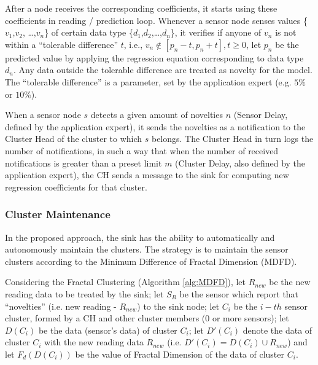 \documentclass{acm_proc_article-sp}
\begin{document}
After a node receives the corresponding coefficients, it starts using these
coefficients in reading / prediction loop.
Whenever a sensor node senses values \{$v_{1}$,$v_{2}$, \ldots,$v_{n}$\} of
certain data type \{$d_{1}$,$d_{2}$,\ldots,$d_{n}$\}, it verifies if anyone of
$v_{n}$ is not within a ``tolerable difference'' $t$, i.e., $v_{n} \not \in
[p_{n}-t,p_{n}+t], t \geq 0$, let $p_{n}$ be the predicted value by applying
the regression equation corresponding to data type $d_{n}$. Any data outside the
tolerable difference are treated as novelty for the model.
The ``tolerable difference'' is a parameter, set by the application expert (e.g.
$5\%$ or $10\%$).



When a sensor node $s$ detects a given amount of novelties $n$ (Sensor Delay,
defined by the application expert), it sends the novelties as a notification to
the Cluster Head of the cluster to which $s$ belongs. The Cluster Head in turn
logs the number of notifications, in such a way that when the number of received
notifications is greater than a preset limit $m$ (Cluster Delay, also
defined by the application expert), the CH sends a message to the sink for
computing new regression coefficients for that cluster.


\subsubsection{Cluster Maintenance}
\label{cluster-maintenance}

In the proposed approach, the sink has the ability to automatically and
autonomously maintain the clusters. The strategy is to maintain the sensor
clusters according to the Minimum Difference of Fractal Dimension (MDFD).

Considering the Fractal Clustering (Algorithm \ref{alg:MDFD}), let $R_{new}$ be
the new reading data to be treated by the sink; let $S_{R}$ be the sensor which
report that ``novelties'' (i.e. new reading - $R_{new}$) to the sink node; let
$C_i$ be the $i-th$ sensor cluster, formed by a CH and other cluster members (0
or more sensors); let $D(C_i)$ be the data (sensor's data) of cluster $C_i$; let
$D'(C_i)$ denote the data of cluster $C_i$ with the new reading data $R_{new}$
(i.e. $D'(C_i) = D(C_i) \cup R_{new}$) and let $F_{d}(D(C_i))$ be the value of
Fractal Dimension of the data of cluster $C_i$.
\end{document}
